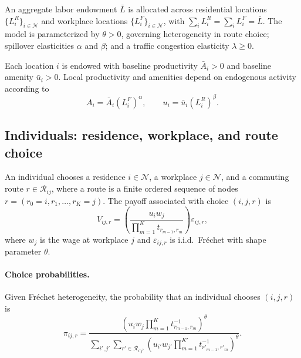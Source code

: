 \documentclass[12pt]{article}
\begin{document}
	An aggregate labor endowment $\bar L$ is allocated across residential locations $\{L_i^R\}_{i\in\mathcal N}$ and workplace locations $\{L_i^F\}_{i\in\mathcal N}$, with $\sum_i L_i^R=\sum_i L_i^F=\bar L$. The model is parameterized by $\theta>0$, governing heterogeneity in route choice; spillover elasticities $\alpha$ and $\beta$; and a traffic congestion elasticity $\lambda\geq 0$.
	
	Each location $i$ is endowed with baseline productivity $\bar A_i>0$ and baseline amenity $\bar u_i>0$. Local productivity and amenities depend on endogenous activity according to
	\begin{equation}
		A_i=\bar A_i (L_i^F)^{\alpha}, \qquad u_i=\bar u_i (L_i^R)^{\beta}.
		\label{eq:fundamentals}
	\end{equation}
	
	\subsection{Individuals: residence, workplace, and route choice}
	An individual chooses a residence $i\in\mathcal N$, a workplace $j\in\mathcal N$, and a commuting route $r\in\mathcal R_{ij}$, where a route is a finite ordered sequence of nodes $r=(r_0=i,r_1,\dots,r_K=j)$. The payoff associated with choice $(i,j,r)$ is
	\begin{equation}
		V_{ij,r}=\left(\frac{u_i w_j}{\prod_{m=1}^{K} t_{r_{m-1},r_m}}\right)\varepsilon_{ij,r},
		\label{eq:utility}
	\end{equation}
	where $w_j$ is the wage at workplace $j$ and $\varepsilon_{ij,r}$ is i.i.d.\ Fr\'echet with shape parameter $\theta$.
	
	\paragraph{Choice probabilities.}
	Given Fr\'echet heterogeneity, the probability that an individual chooses $(i,j,r)$ is
	\begin{equation}
		\pi_{ij,r}
		=
		\frac{\left(u_i w_j \prod_{m=1}^{K} t_{r_{m-1},r_m}^{-1}\right)^{\theta}}
		{\sum_{i',j'}\sum_{r'\in\mathcal R_{i'j'}}
			\left(u_{i'} w_{j'} \prod_{m=1}^{K'} t_{r'_{m-1},r'_m}^{-1}\right)^{\theta}}.
		\label{eq:routeprob}
	\end{equation}
	
\end{document}
